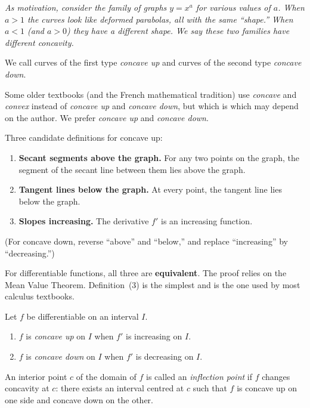 \textit{As motivation, consider the family of graphs $y = x^{a}$ for various values of $a$.  When $a > 1$ the curves look like deformed parabolas, all with the same ``shape.'' When $a < 1$ (and $a > 0$) they have a different shape.  We say these two families have different \emph{concavity}.}

We call curves of the first type \emph{concave up} and curves of the second type \emph{concave down}.

\begin{remark}[Warning]
Some older textbooks (and the French mathematical tradition) use \emph{concave} and \emph{convex} instead of \emph{concave up} and \emph{concave down}, but which is which may depend on the author.  We prefer \emph{concave up} and \emph{concave down}.
\end{remark}

Three candidate definitions for concave up:
\begin{enumerate}[label=(\arabic*)]
  \item \textbf{Secant segments above the graph.}  For any two points on the graph, the segment of the secant line between them lies above the graph.
  \item \textbf{Tangent lines below the graph.}  At every point, the tangent line lies below the graph.
  \item \textbf{Slopes increasing.}  The derivative $f'$ is an increasing function.
\end{enumerate}
(For concave down, reverse ``above'' and ``below,'' and replace ``increasing'' by ``decreasing.'')

For differentiable functions, all three are \textbf{equivalent}.  The proof relies on the Mean Value Theorem.  Definition~(3) is the simplest and is the one used by most calculus textbooks.

\begin{definition}[Concavity]
\label{def:6-2}
Let $f$ be differentiable on an interval $I$.
\begin{enumerate}[label=(\roman*)]
  \item $f$ is \emph{concave up} on $I$ when $f'$ is increasing on $I$.
  \item $f$ is \emph{concave down} on $I$ when $f'$ is decreasing on $I$.
\end{enumerate}
\end{definition}

\begin{definition}
\label{def:6-3}
An interior point $c$ of the domain of $f$ is called an \emph{inflection point} if $f$ changes concavity at $c$: there exists an interval centred at $c$ such that $f$ is concave up on one side and concave down on the other.
\end{definition}

